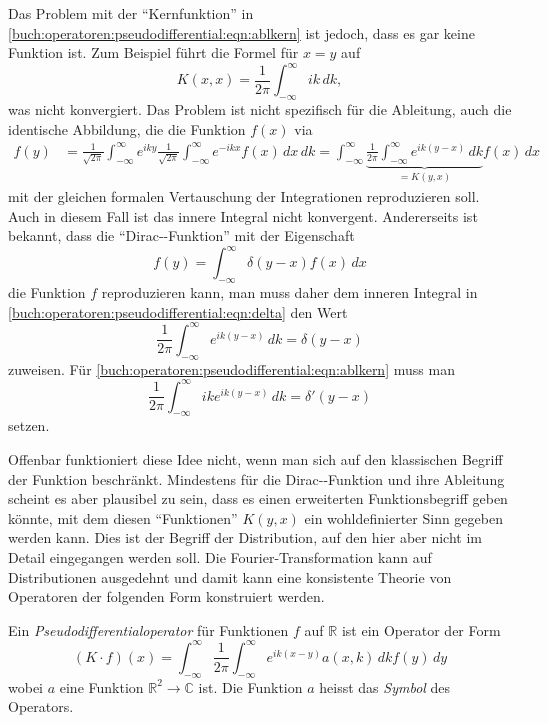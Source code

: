 Das Problem mit der ``Kernfunktion'' in
\eqref{buch:operatoren:pseudodifferential:eqn:ablkern}
ist jedoch, dass es gar keine Funktion ist.
Zum Beispiel führt die Formel für $x=y$ auf
\[
K(x,x)
=
\frac{1}{2\pi}
\int_{-\infty}^\infty 
ik\,dk,
\]
was nicht konvergiert.
Das Problem ist nicht spezifisch für die Ableitung, auch die identische
Abbildung, die die Funktion $f(x)$ via
\begin{align}
f(y)
&=
\frac{1}{\!\sqrt{2\pi}}
\int_{-\infty}^\infty
e^{iky}
\frac{1}{\!\sqrt{2\pi}}
\int_{-\infty}^\infty
e^{-ikx}
f(x)
\,dx
\,dk
=
\int_{-\infty}^\infty
\underbrace{
\frac{1}{2\pi}
\int_{-\infty}^\infty
e^{ik(y-x)}
\,dk
}_{\displaystyle = K(y,x)}
f(x)
\,dx
\label{buch:operatoren:pseudodifferential:eqn:delta}
\end{align}
mit der gleichen formalen Vertauschung der Integrationen reproduzieren
soll.
Auch in diesem Fall ist das innere Integral nicht konvergent.
Andererseits ist bekannt, dass die ``Dirac-\textdelta-Funktion'' 
mit der Eigenschaft
\[
f(y) = \int_{-\infty}^\infty \delta(y-x) f(x)\,dx
\]
die Funktion $f$ reproduzieren kann, man muss daher dem inneren
Integral in \eqref{buch:operatoren:pseudodifferential:eqn:delta} den
Wert
\[
\frac{1}{2\pi}
\int_{-\infty}^\infty e^{ik(y-x)} \,dk
=
\delta (y-x)
\]
zuweisen.
Für
\eqref{buch:operatoren:pseudodifferential:eqn:ablkern}
muss man
\[
\frac{1}{2\pi}
\int_{-\infty}^\infty ike^{ik(y-x)} \,dk
=
\delta'(y-x)
\]
setzen.

Offenbar funktioniert diese Idee nicht, wenn man sich auf den 
klassischen Begriff der Funktion beschränkt.
Mindestens für die Dirac-\textdelta-Funktion und ihre Ableitung
scheint es aber plausibel zu sein, dass es einen erweiterten
Funktionsbegriff geben könnte, mit dem diesen ``Funktionen'' $K(y,x)$
ein wohldefinierter Sinn gegeben werden kann.
Dies ist der Begriff der Distribution, auf den hier aber nicht
im Detail eingegangen werden soll.
Die Fourier-Transformation kann auf Distributionen ausgedehnt und
damit kann eine konsistente Theorie von Operatoren der folgenden Form
konstruiert werden.

\begin{definition}[Pseudodifferentialoperator]
Ein {\em Pseudodifferentialoperator} für Funktionen $f$ auf $\mathbb{R}$ ist
ein Operator der Form
\[
(K\cdot f)(x)
=
\int_{-\infty}^\infty
\frac{1}{2\pi}
\int_{-\infty}^\infty
e^{ik(x-y)}
a(x,k)
\,dk
f(y)\,dy
\]
wobei $a$ eine Funktion $\mathbb{R}^2\to\mathbb{C}$ ist.
Die Funktion $a$ heisst das {\em Symbol} des Operators.
\end{definition}

